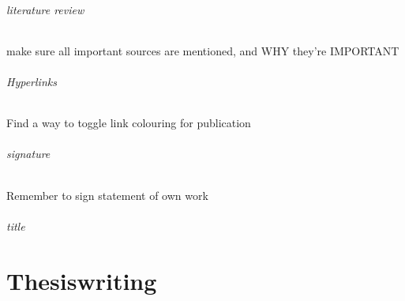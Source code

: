 \paragraph{literature review}
make sure all important sources are mentioned, and WHY they're IMPORTANT

\paragraph{Hyperlinks}
Find a way to toggle link colouring for publication

\paragraph{signature}
Remember to sign statement of own work

\paragraph{title}


\cleardoublepage
\part{Thesiswriting}
\cleardoublepage